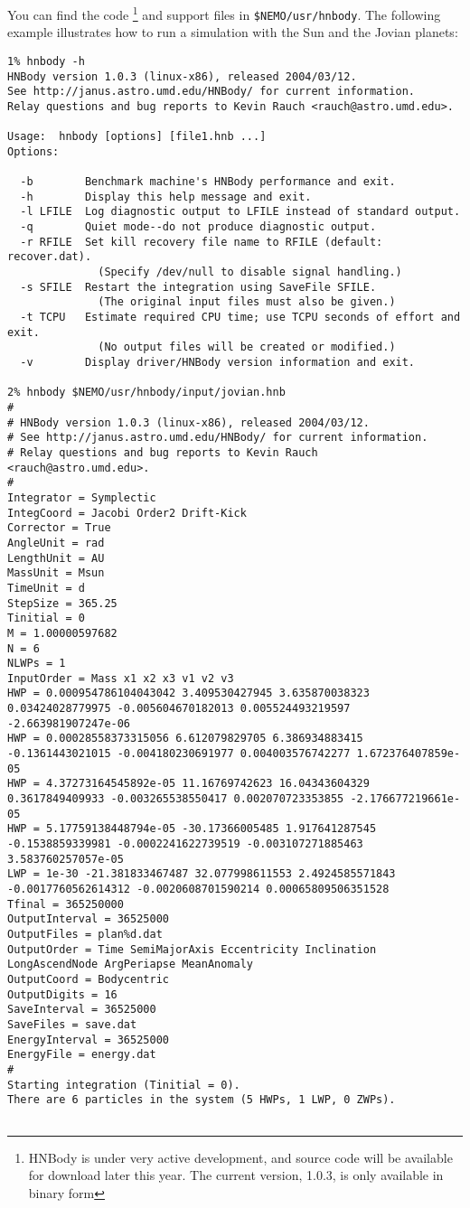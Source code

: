 You can find the code
\footnote{HNBody is under very active development, and source code will be 
available for download later this year. The current version, 1.0.3, is only
available in binary form}
and support files in {\tt \$NEMO/usr/hnbody}. The following example illustrates
how to run a simulation with the Sun and the Jovian planets:

\footnotesize\begin{verbatim}
1% hnbody -h
HNBody version 1.0.3 (linux-x86), released 2004/03/12.
See http://janus.astro.umd.edu/HNBody/ for current information.
Relay questions and bug reports to Kevin Rauch <rauch@astro.umd.edu>.
 
Usage:  hnbody [options] [file1.hnb ...]
Options:
 
  -b        Benchmark machine's HNBody performance and exit.
  -h        Display this help message and exit.
  -l LFILE  Log diagnostic output to LFILE instead of standard output.
  -q        Quiet mode--do not produce diagnostic output.
  -r RFILE  Set kill recovery file name to RFILE (default: recover.dat).
              (Specify /dev/null to disable signal handling.)
  -s SFILE  Restart the integration using SaveFile SFILE.
              (The original input files must also be given.)
  -t TCPU   Estimate required CPU time; use TCPU seconds of effort and exit.
              (No output files will be created or modified.)
  -v        Display driver/HNBody version information and exit.

2% hnbody $NEMO/usr/hnbody/input/jovian.hnb
#
# HNBody version 1.0.3 (linux-x86), released 2004/03/12.
# See http://janus.astro.umd.edu/HNBody/ for current information.
# Relay questions and bug reports to Kevin Rauch <rauch@astro.umd.edu>.
#
Integrator = Symplectic
IntegCoord = Jacobi Order2 Drift-Kick
Corrector = True
AngleUnit = rad
LengthUnit = AU
MassUnit = Msun
TimeUnit = d
StepSize = 365.25
Tinitial = 0
M = 1.00000597682
N = 6
NLWPs = 1
InputOrder = Mass x1 x2 x3 v1 v2 v3
HWP = 0.000954786104043042 3.409530427945 3.635870038323 0.03424028779975 -0.005604670182013 0.005524493219597 -2.663981907247e-06
HWP = 0.00028558373315056 6.612079829705 6.386934883415 -0.1361443021015 -0.004180230691977 0.004003576742277 1.672376407859e-05
HWP = 4.37273164545892e-05 11.16769742623 16.04343604329 0.3617849409933 -0.003265538550417 0.002070723353855 -2.176677219661e-05
HWP = 5.17759138448794e-05 -30.17366005485 1.917641287545 -0.1538859339981 -0.0002241622739519 -0.003107271885463 3.583760257057e-05
LWP = 1e-30 -21.381833467487 32.077998611553 2.4924585571843 -0.0017760562614312 -0.0020608701590214 0.00065809506351528
Tfinal = 365250000
OutputInterval = 36525000
OutputFiles = plan%d.dat
OutputOrder = Time SemiMajorAxis Eccentricity Inclination LongAscendNode ArgPeriapse MeanAnomaly
OutputCoord = Bodycentric
OutputDigits = 16
SaveInterval = 36525000
SaveFiles = save.dat
EnergyInterval = 36525000
EnergyFile = energy.dat
#
Starting integration (Tinitial = 0).
There are 6 particles in the system (5 HWPs, 1 LWP, 0 ZWPs).
 

\end{verbatim}
